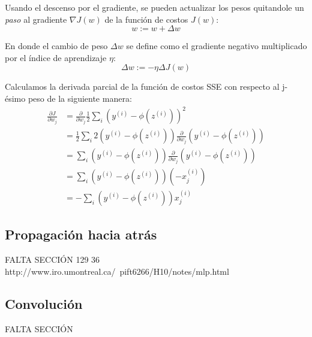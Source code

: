 Usando el descenso por el gradiente, se pueden actualizar los pesos quitandole un \textit{paso}
al gradiente $\nabla J(w)$ de la función de costos $J(w)$:
\begin{equation}
  w := w + \Delta w
\end{equation}

En donde el cambio de peso $\Delta w$ se define como el gradiente negativo multiplicado
por el índice de aprendizaje $\eta$:
\begin{equation}
  \Delta w := -\eta \Delta J(w)
\end{equation}

Calculamos la derivada parcial de la función de costos SSE con respecto al
j-ésimo peso de la siguiente manera:
\begin{equation*}
\begin{split}
  \frac{\partial J}{\partial w_j} &= \frac{\partial}{\partial w_j}\frac{1}{2}\sum_i (y^{(i)} - \phi(z^{(i)}))^2 \\
  &= \frac{1}{2}\sum_i 2(y^{(i)} - \phi(z^{(i)}))\frac{\partial}{\partial w_j}(y^{(i)} - \phi(z^{(i)}))\\
  &= \sum_i (y^{(i)} - \phi(z^{(i)}))\frac{\partial}{\partial w_j}(y^{(i)} - \phi (z^{(i)}))\\
  &= \sum_i(y^{(i)} - \phi(z^{(i)}))(-x_j^{(i)})\\
  &= -\sum_i(y^{(i)} - \phi(z^{(i)}))x_j^{(i)}
\end{split}
\end{equation*}

\subsection{Propagación hacia atrás}
FALTA SECCIÓN
\cite{haykin} 129
\cite{memes} 36
http://www.iro.umontreal.ca/~pift6266/H10/notes/mlp.html

\subsection{Convolución}
FALTA SECCIÓN
